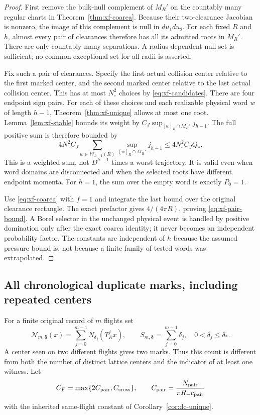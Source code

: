 \begin{proof}
First remove the bulk-null complement of $M_R'$ on the countably
many regular charts in Theorem~\ref{thm:xf-coarea}. Because their
two-clearance Jacobian is nonzero, the image of this complement is
null in $du_1du_2$. For each fixed $R$ and $h$, almost every pair
of clearances therefore has all its admitted roots in $M_R'$.
There are only countably many separations. A radius-dependent null
set is sufficient; no common exceptional set for all radii is
asserted.

Fix such a pair of clearances. Specify the first actual collision
center relative to the first marked center, and the second marked
center relative to the last actual collision center. This has at
most $N_\circ^2$ choices by \eqref{eq:xf-candidates}. There are
four endpoint sign pairs. For each of these choices and each
realizable physical word $w$ of length $h-1$, Theorem~\ref{thm:xf-unique}
allows at most one root. Lemma~\ref{lem:xf-stable} bounds its
weight by $C_J\sup_{[w]_R\cap M_R'}j_{h-1}$. The full positive
sum is therefore bounded by
\[
        4N_\circ^2 C_J
          \sum_{w\in\mathcal W_{h-1}(R)}
                         \sup_{[w]_R\cap M_R'}j_{h-1}
        \le4N_\circ^2 C_JQ_*.
\]
This is a weighted sum, not $D^{h-1}$ times a worst trajectory.
It is valid even when word domains are disconnected and when the
selected roots have different endpoint momenta. For $h=1$, the
sum over the empty word is exactly $P_0=1$.

Use \eqref{eq:xf-coarea} with $f=1$ and integrate the last bound
over the original clearance rectangle. The exact prefactor gives
$4/(4\pi R)$, proving \eqref{eq:xf-pair-bound}. A Borel selector
in the unchanged physical event is handled by positive domination
only after the exact coarea identity; it never becomes an
independent probability factor. The constants are independent of
$h$ because the assumed pressure bound is, not because a finite
family of tested words was extrapolated.
\end{proof}

\subsection{All chronological duplicate marks, including repeated centers}
For a finite original record of $m$ flights set
\begin{equation}\label{eq:xf-counts}
 \mathscr N_{m,\boldsymbol\delta}(x)
      =\sum_{j=0}^{m-1}N_{\delta_j}(T_R^jx),\qquad
 S_{m,\boldsymbol\delta}=\sum_{j=0}^{m-1}\delta_j,
 \quad 0<\delta_j\le\delta_*.
\end{equation}
A center seen on two different flights gives two marks. Thus this
count is different from both the number of distinct lattice centers
and the indicator of at least one witness. Let
\begin{equation}\label{eq:xf-factorial-constant}
 C_F=\max\{2C_{\rm pair},C_{\rm cross}\},\qquad
 C_{\rm pair}=\frac{N_{\rm pair}}{\pi R_-c_{\rm pair}}
\end{equation}
with the inherited same-flight constant of
Corollary~\ref{cor:dc-unique}.

